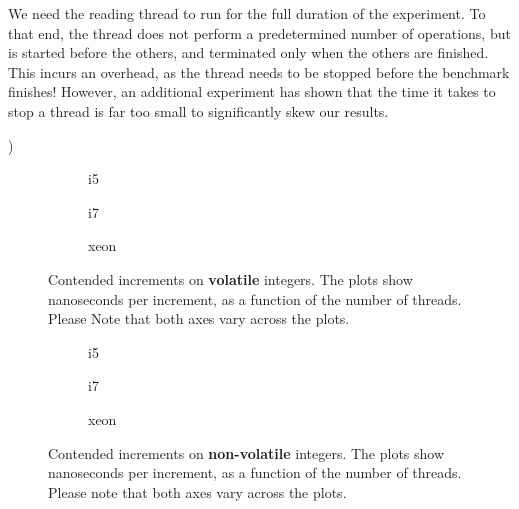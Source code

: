 We need the reading thread to run for the full duration of the experiment. To
that end, the thread does not perform a predetermined number of operations, but
is started before the others, and terminated only when the others are
finished. This incurs an overhead, as the thread needs to be stopped before the
benchmark finishes! However, an additional experiment has shown that the time it
takes to stop a thread is far too small to significantly skew our results.

)

\begin{figure}[hbpt]
	\graphicspath{{plots/}}
	\begin{subfigure}{0.5\textwidth}
		
		\caption{i5}
	\end{subfigure}
	\begin{subfigure}{0.5\textwidth}
		
		\caption{i7}
	\end{subfigure}
	\begin{subfigure}{1\textwidth}
		
		\caption{xeon}
	\end{subfigure}
	\caption{Contended increments on \textbf{volatile} integers. The plots show
	nanoseconds per increment, as a function of the number of threads.
	Please Note that both axes vary across the plots.}
	\label{fig:cont}
\end{figure}

\begin{figure}[hbpt]
	\graphicspath{{plots/}}
	\begin{subfigure}{0.5\textwidth}
		
		\caption{i5}
	\end{subfigure}
	\begin{subfigure}{0.5\textwidth}
		
		\caption{i7}
	\end{subfigure}
	\begin{subfigure}{1\textwidth}
		
		\caption{xeon}
	\end{subfigure}
	\caption{Contended increments on \textbf{non-volatile} integers. The
	plots show nanoseconds per increment, as a function of the number of
	threads. Please note that both axes vary across the plots.}
	\label{fig:cont-nob}
\end{figure}


